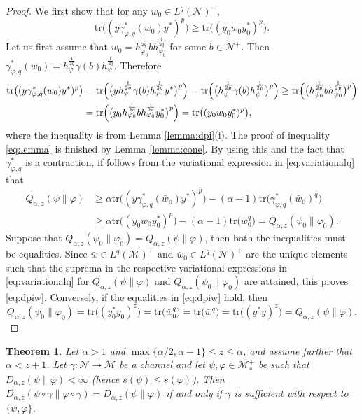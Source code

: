 \documentclass[12pt]{article}
\newtheorem{theorem}{Theorem}[section]
\theoremstyle{definition}
\theoremstyle{remark}
\numberwithin{equation}{section}
\def\Me{\mathcal M}
\def\Ne{\mathcal N}
\def\Tr{\mathrm{tr}}
\def\ffi{\varphi}
\begin{document}
\begin{proof} We first show that  for any $w_0\in L^q(\Ne)^+$,
\begin{equation}\label{eq:lemma}
\Tr\bigl((y\gamma^*_{\ffi,q}(w_0)y^*)^p\bigr)\ge
\Tr\bigl((y_0w_0y_0^*)^p\bigr).
\end{equation}
Let us first assume that
$w_0=h_{\varphi_0}^{\frac1{2q}}bh_{\varphi_0}^{\frac1{2q}}$ for some $b\in \Ne^+$. Then 
$\gamma^*_{\varphi,q}(w_0)=h_{\varphi}^{\frac1{2q}}\gamma(b)h_{\varphi}^{\frac1{2q}}$.
Therefore
\begin{align*}
\Tr\bigl((y\gamma^*_{\varphi,q}(w_0)y^*)^p\bigr)
&=\Tr\Bigl(\bigl(yh_{\varphi}^{\frac1{2q}}\gamma(b)h_{\varphi}^{\frac1{2q}}y^*\bigr)^p\Bigr)=
\Tr\Bigl(\bigl(h_\psi^{\frac1{2p}}\gamma(b)h_\psi^{\frac1{2p}}\bigr)^p\Bigr)\ge
\Tr\Bigl(\bigl(h_{\psi_0}^{\frac1{2p}}bh_{\psi_0}^{\frac1{2p}}\bigr)^p\Bigr)\\
&=\Tr\Bigl(\bigl(y_0h_{\varphi_0}^{\frac1{2q}}bh_{\varphi_0}^{\frac1{2q}}y_0^*\bigr)^p\Bigr)
=\Tr\bigl((y_0w_0y_0^*)^p\bigr),
\end{align*}
where the inequality is from Lemma \ref{lemma:dpi}(i). The proof of inequality
\eqref{eq:lemma} is  finished  by Lemma \ref{lemma:cone}.
By using this and the fact that $\gamma^*_{\ffi,q}$ is a contraction, if follows from the variational
expression in \eqref{eq:variationalq} that
\begin{align*}
Q_{\alpha,z}(\psi\|\varphi)
&\ge \alpha\Tr\bigl((y\gamma^*_{\varphi,q}(\bar w_0)y^*)^p\bigr)-
(\alpha-1)\Tr\bigl(\gamma^*_{\varphi,q}(\bar w_0)^q\bigr)\\
&\ge \alpha\Tr\bigr((y_0\bar w_0 y_0^*)^p\bigr)-(\alpha-1)\Tr\bigl(\bar
w_0^q\bigr)=Q_{\alpha,z}(\psi_0\|\varphi_0).
\end{align*}
Suppose that $Q_{\alpha,z}(\psi_0\|\varphi_0)=Q_{\alpha,z}(\psi\|\varphi)$, then both the
inequalities must be equalities. Since $\bar
w\in L^q(\Me)^+$ and $\bar w_0\in L^q(\Ne)^+$ are the unique elements such that the suprema
in the respective variational expressions in \eqref{eq:variationalq} for
$Q_{\alpha,z}(\psi\|\varphi)$ and $Q_{\alpha,z}(\psi_0\|\varphi_0)$ are attained, this proves
\eqref{eq:dpiw}. Conversely, if the equalities in \eqref{eq:dpiw} hold, then
\[
Q_{\alpha,z}(\psi_0\|\ffi_0)=\Tr\bigl((y_0^*y_0)^z\bigr)=\Tr\bigl(\bar w_0^q\bigr)
=\Tr\bigl(\bar w^q\bigr)=\Tr\bigl((y^*y)^z\bigr)=Q_{\alpha,z}(\psi\|\ffi).
\]
\end{proof}


\begin{theorem}\label{thm:suffge1}
{Let $\alpha>1$ and $\max\{\alpha/2,\alpha-1\}\le z\le\alpha$, and assume further that
$\alpha<z+1$.} Let $\gamma:\Ne\to \Me$ be a channel and let $\psi,\varphi\in \Me_*^+$ be such that 
$D_{\alpha,z}(\psi\|\varphi)<\infty$ {\color{red}(hence $s(\psi)\le s(\ffi)$).} Then
$D_{\alpha,z}(\psi\circ\gamma\|\ffi\circ\gamma)=D_{\alpha,z}(\psi\|\varphi)$ if and only if
$\gamma$ is sufficient with respect to $\{\psi,\ffi\}$.
\end{theorem}
\end{document}
